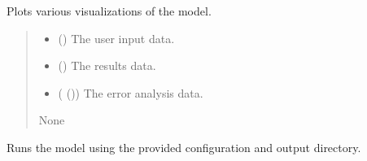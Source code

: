 \documentclass[a4paper,11pt,english,openany]{sphinxmanual}
\begin{document}
\begin{fulllineitems}
\begin{fulllineitems}
\label{\detokenize{api/spyice.main_process:spyice.main_process.MainProcess.plot_model}}
\pysigstartsignatures
{}
\pysigstopsignatures
\sphinxAtStartPar
Plots various visualizations of the model.
\begin{quote}\begin{description}
\begin{itemize}
\item {} 
\sphinxAtStartPar
{} () \textendash{} The user input data.

\item {} 
\sphinxAtStartPar
{} () \textendash{} The results data.

\item {} 
\sphinxAtStartPar
{} ({\hyperref[\detokenize{api/spyice.postprocess.analysis:spyice.postprocess.analysis.AnalysisData}]{}} ()) \textendash{} The error analysis data.

\end{itemize}

\sphinxAtStartPar
None

\sphinxAtStartPar
{} \textendash{} 

\end{description}\end{quote}

\end{fulllineitems}


\begin{fulllineitems}
\label{\detokenize{api/spyice.main_process:spyice.main_process.MainProcess.run_model}}
\pysigstartsignatures
{}
\pysigstopsignatures
\sphinxAtStartPar
Runs the model using the provided configuration and output directory.
\begin{quote}\begin{description}
\sphinxAtStartPar
{}


\end{description}
\end{quote}
\end{fulllineitems}
\end{fulllineitems}
\end{document}
